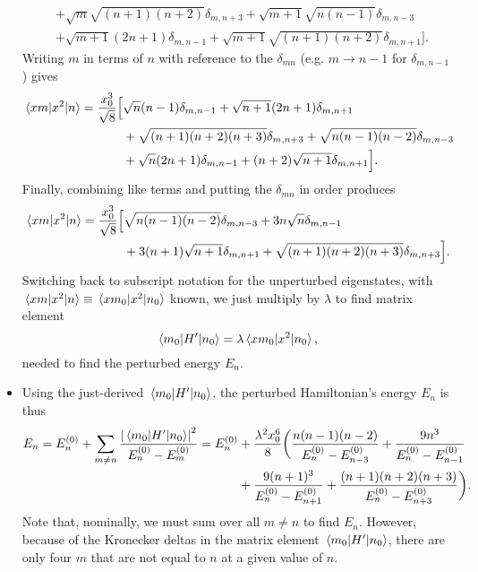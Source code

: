\documentclass[11pt, a4paper]{article}
\newcommand{\Ham}{Hamiltonian\xspace}
\begin{document}
\begin{itemize}
\begin{align*}
		& + \sqrt{m}\sqrt{(n+1)(n+2)}\delta_{m,n+3} + \sqrt{m+1}\sqrt{n(n-1)}\delta_{m,n-3}\\
		& + \sqrt{m+1}(2n+1)\delta_{m,n-1} + \sqrt{m+1}\sqrt{(n+1)(n+2)}\delta_{m,n+1} \Big].
	\end{align*}	
	Writing $ m $ in terms of $ n $ with reference to the $ \delta_{mn} $ (e.g. $ m \to n -1 $ for $ \delta_{m, n-1} $) gives
	\begin{align*}
			\mel{xm}{x^{2}}{n} = \frac{x_{0}^{3}}{\sqrt{8}} \Big[& \sqrt{n}(n-1) \delta_{m, n-1} + \sqrt{n+1}(2n+1)\delta_{m, n+1} \\
			& + \sqrt{(n+1)(n+2)(n+3)}\delta_{m, n+3}  + \sqrt{n(n-1)(n-2)}\delta_{m, n-3} \\
			& + \sqrt{n}(2n+1)\delta_{m, n-1} + (n+2)\sqrt{n+1}\delta_{m, n+1}\Big].
	\end{align*}
	Finally, combining like terms and putting the $ \delta_{mn} $ in order produces
	\begin{align*}
		\mel{xm}{x^{2}}{n} = \frac{x_{0}^{3}}{\sqrt{8}} \Big[&\sqrt{n(n-1)(n-2)}\delta_{m, n-3} + 3n\sqrt{n}\delta_{m, n-1}\\
		& + 3(n+1)\sqrt{n+1}\delta_{m, n+1} + \sqrt{(n+1)(n+2)(n+3)}\delta_{m, n+3}\Big].
	\end{align*}
	Switching back to subscript notation for the unperturbed eigenstates, with $ \mel{xm}{x^{2}}{n} \equiv \mel{xm_{0}}{x^{2}}{n_{0}} $ known, we just multiply by $ \lambda $ to find matrix element
	\begin{equation*}
		\mel{m_{0}}{H'}{n_{0}} = \lambda \mel{xm_{0}}{x^{2}}{n_{0}},
	\end{equation*}
 	needed to find the perturbed energy $ E_{n} $.
	
	\item Using the just-derived $ \mel{m_{0}}{H'}{n_{0}}  $, the perturbed \Ham's energy $ E_{n} $ is thus
	\begin{align*}
		E_{n} = E^{(0)}_{n} + \sum_{m \neq n} \frac{\abs{\mel{m_{0}}{H'}{n_{0}}}^{2}}{E^{(0)}_{n} - E^{(0)}_{m}} = E^{(0)}_{n} &+ \frac{\lambda^{2} x_{0}^{6}}{8}\bigg(\frac{n(n-1)(n-2)}{E^{(0)}_{n}-E^{(0)}_{n-3}} + \frac{9n^{3}}{E^{(0)}_{n}-E^{(0)}_{n-1}} \\
		&+ \frac{9(n+1)^{3}}{E^{(0)}_{n} - E^{(0)}_{n+1}} + \frac{(n+1)(n+2)(n+3)}{E^{(0)}_{n} - E^{(0)}_{n+3}} \bigg).
	\end{align*}
	Note that, nominally, we must sum over all $ m \neq n $ to find $ E_{n} $. However, because of the Kronecker deltas in the matrix element $ \mel{m_{0}}{H'}{n_{0}} $, there are only four $ m $ that are not equal to $ n $ at a given value of $ n $. 
	

\end{itemize}
\end{document}
